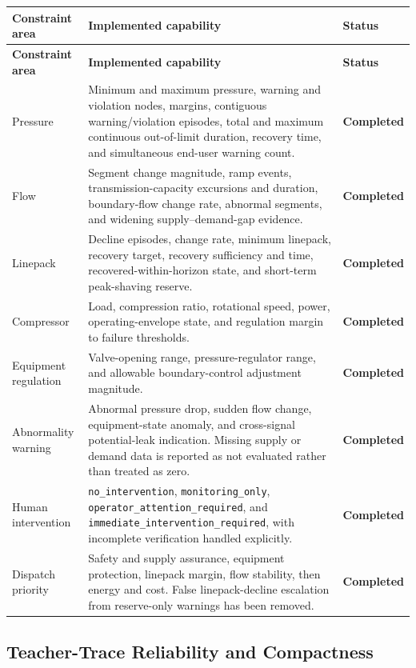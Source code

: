 \documentclass[11pt,a4paper]{article}
\newcommand{\done}{\textcolor{donegreen}{\textbf{Completed}}}
\newcommand{\code}[1]{\texttt{#1}}
\begin{document}
\begin{longtable}{p{}p{}p{}}
\toprule
\textbf{Constraint area} & \textbf{Implemented capability} & \textbf{Status} \\
\midrule
\endfirsthead
\toprule
\textbf{Constraint area} & \textbf{Implemented capability} & \textbf{Status} \\
\midrule
\endhead
Pressure & Minimum and maximum pressure, warning and violation nodes, margins, contiguous warning/violation episodes, total and maximum continuous out-of-limit duration, recovery time, and simultaneous end-user warning count. & \done \\
Flow & Segment change magnitude, ramp events, transmission-capacity excursions and duration, boundary-flow change rate, abnormal segments, and widening supply--demand-gap evidence. & \done \\
Linepack & Decline episodes, change rate, minimum linepack, recovery target, recovery sufficiency and time, recovered-within-horizon state, and short-term peak-shaving reserve. & \done \\
Compressor & Load, compression ratio, rotational speed, power, operating-envelope state, and regulation margin to failure thresholds. & \done \\
Equipment regulation & Valve-opening range, pressure-regulator range, and allowable boundary-control adjustment magnitude. & \done \\
Abnormality warning & Abnormal pressure drop, sudden flow change, equipment-state anomaly, and cross-signal potential-leak indication. Missing supply or demand data is reported as not evaluated rather than treated as zero. & \done \\
Human intervention & \code{no\_intervention}, \code{monitoring\_only}, \code{operator\_attention\_required}, and \code{immediate\_intervention\_required}, with incomplete verification handled explicitly. & \done \\
Dispatch priority & Safety and supply assurance, equipment protection, linepack margin, flow stability, then energy and cost. False linepack-decline escalation from reserve-only warnings has been removed. & \done \\
\bottomrule
\end{longtable}

\subsection{Teacher-Trace Reliability and Compactness}
\end{document}
